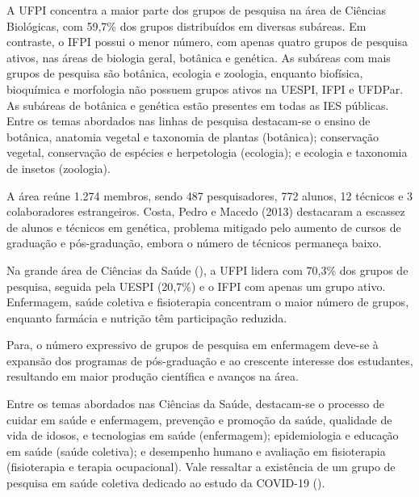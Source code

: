 \documentclass[portuguese]{textolivre}
\begin{document}
A UFPI concentra a maior parte dos grupos de pesquisa na área de Ciências Biológicas, com 59,7\% dos grupos distribuídos em diversas subáreas. Em contraste, o IFPI possui o menor número, com apenas quatro grupos de pesquisa ativos, nas áreas de biologia geral, botânica e genética. As subáreas com mais grupos de pesquisa são botânica, ecologia e zoologia, enquanto biofísica, bioquímica e morfologia não possuem grupos ativos na UESPI, IFPI e UFDPar. As subáreas de botânica e genética estão presentes em todas as IES públicas. Entre os temas abordados nas linhas de pesquisa destacam-se o ensino de botânica, anatomia vegetal e taxonomia de plantas (botânica); conservação vegetal, conservação de espécies e herpetologia (ecologia); e ecologia e taxonomia de insetos (zoologia).

A área reúne 1.274 membros, sendo 487 pesquisadores, 772 alunos, 12 técnicos e 3 colaboradores estrangeiros. Costa, Pedro e Macedo (2013) destacaram a escassez de alunos e técnicos em genética, problema mitigado pelo aumento de cursos de graduação e pós-graduação, embora o número de técnicos permaneça baixo.

Na grande área de Ciências da Saúde (), a UFPI lidera com 70,3\% dos grupos de pesquisa, seguida pela UESPI (20,7\%) e o IFPI com apenas um grupo ativo. Enfermagem, saúde coletiva e fisioterapia concentram o maior número de grupos, enquanto farmácia e nutrição têm participação reduzida.

Para\textcite{costa2018}, o número expressivo de grupos de pesquisa em enfermagem deve-se à expansão dos programas de pós-graduação e ao crescente interesse dos estudantes, resultando em maior produção científica e avanços na área.

Entre os temas abordados nas Ciências da Saúde, destacam-se o processo de cuidar em saúde e enfermagem, prevenção e promoção da saúde, qualidade de vida de idosos, e tecnologias em saúde (enfermagem); epidemiologia e educação em saúde (saúde coletiva); e desempenho humano e avaliação em fisioterapia (fisioterapia e terapia ocupacional). Vale ressaltar a existência de um grupo de pesquisa em saúde coletiva dedicado ao estudo da COVID-19 ().
\end{document}
